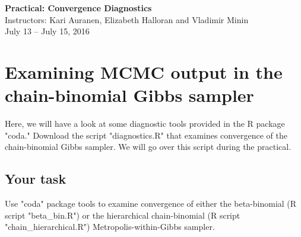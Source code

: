 \documentclass[11pt]{article}
\numberwithin{algorithm}{section}
\theoremstyle{remark}
\theoremstyle{definition}
\numberwithin{equation}{section}
\numberwithin{figure}{section}
\begin{document}


\begin{center}
  \textbf{\Large Practical: Convergence Diagnostics}\\
  {\large Instructors: Kari Auranen, Elizabeth Halloran and Vladimir Minin}\\
  {\large July 13 -- July 15, 2016}
\end{center}

\section*{Examining MCMC output in the chain-binomial Gibbs sampler}
Here, we will have a look at some diagnostic tools provided in the R package "coda." Download the script "diagnostics.R" that examines convergence of the chain-binomial Gibbs sampler.  We will go over this script during the practical. 

\subsection*{Your task}
Use "coda" package tools to examine convergence of either the beta-binomial (R script "beta\_bin.R") or the hierarchical chain-binomial (R script "chain\_hierarchical.R") Metropolis-within-Gibbs sampler. 
\end{document}
